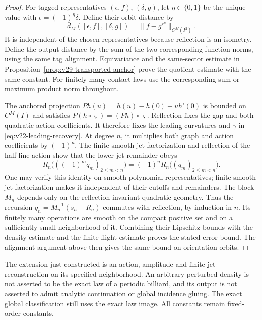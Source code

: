 \begin{proof}
For tagged representatives \((\epsilon,f)\), \((\delta,g)\), let
\(\eta\in\{0,1\}\) be the unique value with
\(\epsilon=(-1)^\eta\delta\).  Define their orbit distance by
\[
 \bar d_M([\epsilon,f],[\delta,g])
                  =\|f-g^{r^\eta}\|_{C^M(I^2)}.
\]
It is independent of the chosen representatives because reflection is an
isometry.  Define the output distance by the sum of the two corresponding
function norms, using the same tag alignment.  Equivariance and the
same-sector estimate in Proposition~\ref{prop:v29-transported-anchor} prove
the quotient estimate with the same constant.  For finitely many contact
laws use the corresponding sum or maximum product norm throughout.

The anchored projection
\(Ph(u)=h(u)-h(0)-u h'(0)\) is bounded on \(C^M(I)\) and satisfies
\(P(h\circ\varsigma)=(Ph)\circ\varsigma\).  Reflection fixes the gap and
both quadratic action coefficients.  It therefore fixes the leading
curvatures and \(\gamma\) in \eqref{eq:v22-leading-recovery}.  At degree
\(n\), it multiplies both graph and action coefficients by \((-1)^n\).
The finite smooth-jet factorization and reflection of the half-line action
show that the lower-jet remainder obeys
\[
 R_n\bigl(((-1)^m q_m)_{2\le m<n}\bigr)
                       =(-1)^n R_n\bigl((q_m)_{2\le m<n}\bigr).
\]
One may verify this identity on smooth polynomial representatives; finite
smooth-jet factorization makes it independent of their cutoffs and
remainders.  The block \(M_n\) depends only on the reflection-invariant
quadratic geometry.  Thus the recursion
\(q_n=M_n^{-1}(s_n-R_n)\) commutes with reflection, by induction in \(n\).
Its finitely many operations are smooth on the compact positive set and on
a sufficiently small neighborhood of it.  Combining their Lipschitz bounds
with the density estimate and the finite-flight estimate proves the stated
error bound.  The alignment argument above then gives the same bound on
orientation orbits.
\end{proof}

The extension just constructed is an action, amplitude and finite-jet
reconstruction on its specified neighborhood.  An arbitrary perturbed
density is not asserted to be the exact law of a periodic billiard, and its
output is not asserted to admit analytic continuation or global incidence
gluing.  The exact global classification still uses the exact law image.
All constants remain fixed-order constants.

